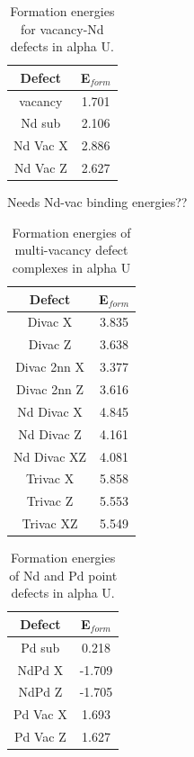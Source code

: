 \documentclass[review]{elsarticle}
\begin{document}
\begin{table}[h!]
\caption{Formation energies for vacancy-Nd defects in alpha U.}
\label{tab:Eforms}
\begin{center}
\begin{tabular}{|c|c|}
     \hline
      Defect & E$_{form}$  \\
     \hline
     vacancy & 1.701  \\
     Nd sub & 2.106 \\
     Nd Vac X & 2.886 \\
     Nd Vac Z & 2.627 \\
       \hline
\end{tabular}
\end{center}
\label{default}
\end{table}%

Needs Nd-vac binding energies??

\begin{table}[h!]
\caption{Formation energies of multi-vacancy defect complexes in alpha U}
\label{tab:Eforms}
\begin{center}
\begin{tabular}{|c|c|}
     \hline
      Defect & E$_{form}$  \\
     \hline
     Divac X & 3.835 \\
     Divac Z & 3.638 \\
     Divac 2nn X & 3.377 \\
     Divac 2nn Z & 3.616 \\
     Nd Divac X & 4.845 \\
     Nd Divac Z & 4.161 \\
     Nd Divac XZ & 4.081 \\
     Trivac X & 5.858\\
     Trivac Z & 5.553 \\
     Trivac XZ & 5.549 \\
       \hline
\end{tabular}
\end{center}
\label{default}
\end{table}%

\begin{table}[h!]
\caption{Formation energies of Nd and Pd point defects in alpha U.}
\label{tab:Eforms}
\begin{center}
\begin{tabular}{|c|c|}
     \hline
      Defect & E$_{form}$  \\
     \hline
     Pd sub & 0.218 \\
     NdPd X &  -1.709 \\
     NdPd Z & -1.705 \\
     Pd Vac X & 1.693 \\
     Pd Vac Z & 1.627 \\
       \hline
\end{tabular}
\end{center}
\label{default}
\end{table}%
\end{document}
